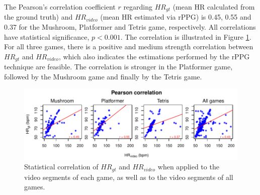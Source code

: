 The Pearson's correlation coefficient $r$ regarding $HR_{gt}$ (mean HR calculated from the ground truth) and $HR_{video}$ (mean HR estimated via rPPG) is 0.45, 0.55 and 0.37 for the Mushroom, Platformer and Tetris game, respectively. All correlations have statistical significance, $p < 0.001$. The correlation is illustrated in Figure \ref{fig:chart-r-games}. For all three games, there is a positive and medium strength correlation between $HR_{gt}$ and $HR_{video}$, which also indicates the estimations performed by the rPPG technique are feasible. The correlation is stronger in the Platformer game, followed by the Mushroom game and finally by the Tetris game.

\begin{figure}
\centering
\includegraphics[width=\columnwidth]{figures/correlation-hrgt-hrvideo.pdf}
\caption{Statistical correlation of $HR_{gt}$ and $HR_{video}$ when applied to the video segments of each game, as well as to the video segments of all games.}
\label{fig:chart-r-games}
\end{figure}

